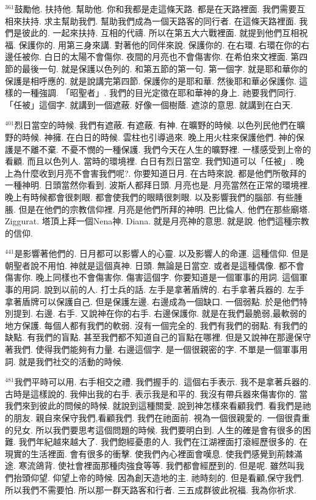 \documentclass{book}
\begin{document}
$^{361}$鼓勵他.
扶持他.
幫助他.
你和我都是走這條天路.
都是在天路裡面.
我們需要互相來扶持.
求主幫助我們.
幫助我們成為一個天路客的同行者.
在這條天路裡面.
我們是彼此的.
一起來扶持.
互相的代禱.
所以在第五大六戰裡面.
就提到他們互相祝福.
保護你的.
用第三身來講.
對著他的同伴來說.
保護你的.
在右環.
右環在你的右邊任被你.
白日的太陽不會傷你.
夜間的月亮也不會傷害你.
在希伯來文裡面.
第四節的最後一句.
就是保護以色列的.
和第五節的第一句.
第一個字.
就是耶和華你的保護是相呼應的.
就是說講完第四節.
保護你的是耶和華.
然後耶和華必保護你.
這樣的一種強調.
「昭聖者」.
我們的目光定徵在耶和華神的身上.
祂要我們同行.
「任被」這個字.
就講到一個遮蔽.
好像一個樹蔭.
遮涼的意思.
就講到在白天.

$^{401}$烈日當空的時候.
我們有遮蔽.
有遮蔽.
有神.
在曠野的時候.
以色列民他們在曠野的時候.
神擁.
在白日的時候.
雲柱也引導過來.
晚上用火柱來保護他們.
神的保護是不離不棄.
不憂不憫的一種保護.
我們今天在人生的曠野裡.
一樣感受到上帝的看顧.
而且以色列人.
當時的環境裡.
白日有烈日當空.
我們知道可以「任被」.
晚上為什麼收到月亮不會害我們呢?.
你要知道日月.
在古時來說.
都是他們所敬拜的一種神明.
日頭當然你看到.
波斯人都拜日頭.
月亮也是.
月亮當然在正常的環境裡.
晚上有時候都會很刺眼.
都會使我們的眼睛很刺眼.
以及影響我們的腦部.
有些腫脹.
但是在他們的宗教信仰裡.
月亮是他們所拜的神明.
巴比倫人.
他們在那些廟塔.
Ziggurat.
塔頂上拜一個Nena神.
Diana.
就是月亮神的意思.
就是說.
他們這種宗教的信仰.

$^{441}$是影響著他們的.
日月都可以影響人的心靈.
以及影響人的命運.
這種信仰.
但是朝聖者說不用怕.
神就是這個真神.
日頭.
無論是日當空.
或者是這種偶像.
都不會傷害你.
晚上同樣也不會傷害你.
傷害這個字.
你要知道是一個軍事的用詞.
這個軍事的用詞.
說到以前的人.
打士兵的話.
左手是拿著盾牌的.
右手拿著兵器的.
左手拿著盾牌可以保護自己.
但是保護左邊.
右邊成為一個缺口.
一個弱點.
於是他們特別提到.
右邊.
右手.
又說神在你的右手.
右邊保護你.
就是在我們最脆弱,最軟弱的地方保護.
每個人都有我們的軟弱.
沒有一個完全的.
我們有我們的弱點.
有我們的缺點.
有我們的盲點.
甚至我們都不知道自己的盲點在哪裡.
但是又說神在那邊保守著我們.
使得我們能夠有力量.
右邊這個字.
是一個很親密的字.
不單是一個軍事用詞.
就是我們社交的活動的時候.

$^{481}$我們平時可以用.
右手相交之禮.
我們握手的.
這個右手表示.
我不是拿著兵器的.
古時是這樣說的.
我伸出我的右手.
表示我是和平的.
我沒有帶兵器來傷害你的.
當我們來到彼此的問候的時候.
就說到這種關愛.
說到神怎樣來看顧我們.
看我們是祂的朋友.
親自來保守我們,看顧我們.
我們在祂面前.
視為一個很親愛的.
一個很貴重的兒女.
所以我們要思考這個問題的時候.
我們要明白到.
人生的確是會有很多的困難.
我們年紀越來越大了.
我們飽經憂患的人.
我們在江湖裡面打滾經歷很多的.
在現實的生活裡面.
會有很多的衝擊.
使我們內心裡面會嘆息.
使我們感覺到荊棘滿途.
寒流鴿背.
使社會裡面那種肉強食等等.
我們都會經歷到的.
但是呢.
雖然叫我們抬頭仰望.
仰望上帝的時候.
因為創天造地的主.
祂時刻的.
但是看顧,保守我們.
所以我們不需要怕.
所以那一群天路客和行者.
三五成群彼此祝福.
我為你祈求.
\end{document}
